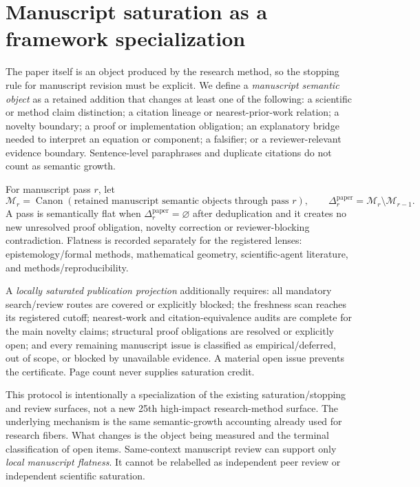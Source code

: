 \section{Manuscript saturation as a framework specialization}

The paper itself is an object produced by the research method, so the stopping rule for manuscript revision must be explicit. We define a \emph{manuscript semantic object} as a retained addition that changes at least one of the following: a scientific or method claim distinction; a citation lineage or nearest-prior-work relation; a novelty boundary; a proof or implementation obligation; an explanatory bridge needed to interpret an equation or component; a falsifier; or a reviewer-relevant evidence boundary. Sentence-level paraphrases and duplicate citations do not count as semantic growth.

For manuscript pass \(r\), let
\[
\mathcal M_r=\operatorname{Canon}
(\text{retained manuscript semantic objects through pass }r),
\qquad
\Delta_r^{\mathrm{paper}}=\mathcal M_r\setminus\mathcal M_{r-1}.
\]
A pass is semantically flat when \(\Delta_r^{\mathrm{paper}}=\varnothing\) after deduplication and it creates no new unresolved proof obligation, novelty correction or reviewer-blocking contradiction. Flatness is recorded separately for the registered lenses: epistemology/formal methods, mathematical geometry, scientific-agent literature, and methods/reproducibility.

A \emph{locally saturated publication projection} additionally requires: all mandatory search/review routes are covered or explicitly blocked; the freshness scan reaches its registered cutoff; nearest-work and citation-equivalence audits are complete for the main novelty claims; structural proof obligations are resolved or explicitly open; and every remaining manuscript issue is classified as empirical/deferred, out of scope, or blocked by unavailable evidence. A material open issue prevents the certificate. Page count never supplies saturation credit.

This protocol is intentionally a specialization of the existing saturation/stopping and review surfaces, not a new 25th high-impact research-method surface. The underlying mechanism is the same semantic-growth accounting already used for research fibers. What changes is the object being measured and the terminal classification of open items. Same-context manuscript review can support only \emph{local manuscript flatness}. It cannot be relabelled as independent peer review or independent scientific saturation.

